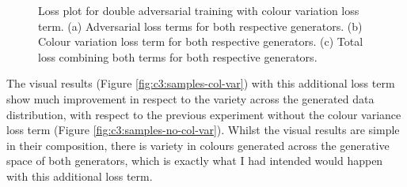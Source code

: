   \begin{figure}[!htbp]
    \centering
    \hfill
    \hfill
    \caption[Loss plot for double adversarial training with colour variation loss term]{Loss plot for double adversarial training with colour variation loss term. (a) Adversarial loss terms for both respective generators. (b) Colour variation loss term for both respective generators. (c) Total loss combining both terms for both respective generators. }
    \label{fig:c3:col-var-losses}
  \end{figure}

\FloatBarrier

The visual results (Figure \ref{fig:c3:samples-col-var}) with this additional loss term show much improvement in respect to the variety across the generated data distribution, with respect to the previous experiment without the colour variance loss term (Figure \ref{fig:c3:samples-no-col-var}).
Whilst the visual results are simple in their composition, there is variety in colours generated across the generative space of both generators, which is exactly what I had intended would happen with this additional loss term. 

